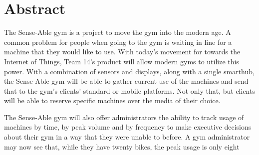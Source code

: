 \documentclass[ppfs.tex]{template/subfiles}
\begin{document}
\section*{Abstract}

The Sense-Able gym is a project to move the gym into the modern age. A common problem for people when going to the gym is waiting in line for a machine that they would like to use. With today's movement for towards the Internet of Things, Team 14's product will allow modern gyms to utilize this power. With a combination of sensors and displays, along with a single smarthub, the Sense-Able gym will be able to gather current use of the machines and send that to the gym's clients' standard or mobile platforms. Not only that, but clients will be able to reserve specific machines over the media of their choice.

The Sense-Able gym will also offer administrators the ability to track usage of machines by time, by peak volume and by frequency to make executive decisions about their gym in a way that they were unable to before. A gym administrator may now see that, while they have twenty bikes, the peak usage is only eight
\end{document}
